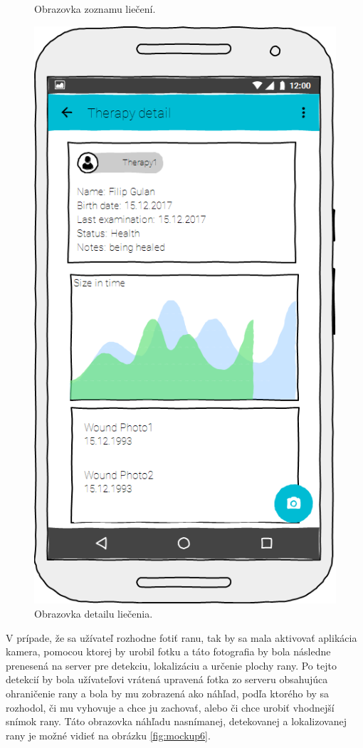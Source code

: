 \begin{figure}[h]
\begin{minipage}{0.48\textwidth}
      \caption{Obrazovka zoznamu liečení.}
      \label{fig:mockup4}
   \end{minipage}\hfill
   \begin {minipage}{0.48\textwidth}
     \centering
     \includegraphics[scale=0.45]{fig/mockup5.png}
      \caption{Obrazovka detailu liečenia.}
      \label{fig:mockup5}
   \end{minipage}
\end{figure}

V prípade, že sa užívateľ rozhodne fotiť ranu, tak by sa mala aktivovať aplikácia kamera, pomocou ktorej by urobil fotku a táto fotografia by bola následne prenesená na server pre detekciu, lokalizáciu a určenie plochy rany. Po tejto detekcií by bola užívateľovi vrátená upravená fotka zo serveru obsahujúca ohraničenie rany a bola by mu zobrazená ako náhľad, podľa ktorého by sa rozhodol, či mu vyhovuje a chce ju zachovať, alebo či chce urobiť vhodnejší snímok rany. Táto obrazovka náhľadu nasnímanej, detekovanej a lokalizovanej rany je možné vidieť na obrázku \ref{fig:mockup6}. 

